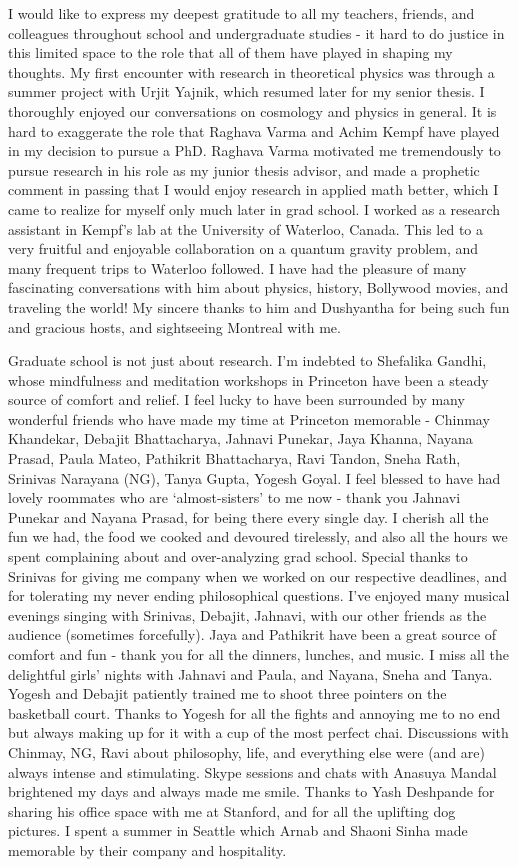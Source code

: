 I would like to express my deepest gratitude to all my teachers, friends, and colleagues throughout school and undergraduate studies - it hard to do justice in this limited space to the role that all of them have played in shaping my thoughts. My first encounter with research in theoretical physics was through a summer project with Urjit Yajnik, which resumed later for my senior thesis. I thoroughly enjoyed our conversations on cosmology and physics in general. It is hard to exaggerate the role that Raghava Varma and Achim Kempf have played in my decision to pursue a PhD. Raghava Varma motivated me tremendously to pursue research in his role as my junior thesis advisor, and made a prophetic comment in passing that I would enjoy research in applied math better, which I came to realize for myself only much later in grad school. I worked as a research assistant in Kempf's lab at the University of Waterloo, Canada. This led to a very fruitful and enjoyable collaboration on a quantum gravity problem, and many frequent trips to Waterloo followed. I have had the pleasure of many fascinating conversations with him about physics, history, Bollywood movies, and traveling the world! My sincere thanks to him and Dushyantha for being such fun and gracious hosts, and sightseeing Montreal with me.

Graduate school is not just about research. I'm indebted to Shefalika Gandhi, whose mindfulness and meditation workshops in Princeton have been a steady source of comfort and relief. I feel lucky to have been surrounded by many wonderful friends who have made my time at Princeton memorable - Chinmay Khandekar, Debajit Bhattacharya, Jahnavi Punekar, Jaya Khanna, Nayana Prasad, Paula Mateo, Pathikrit Bhattacharya, Ravi Tandon, Sneha Rath, Srinivas Narayana (NG), Tanya Gupta, Yogesh Goyal. I feel blessed to have had lovely roommates who are `almost-sisters’ to me now - thank you Jahnavi Punekar and Nayana Prasad, for being there every single day. I cherish all the fun we had, the food we cooked and devoured tirelessly, and also all the hours we spent complaining about and over-analyzing grad school. Special thanks to Srinivas for giving me company when we worked on our respective deadlines, and for tolerating my never ending philosophical questions. I've enjoyed many musical evenings singing with Srinivas, Debajit, Jahnavi, with our other friends as the audience (sometimes forcefully). Jaya and Pathikrit have been a great source of comfort and fun - thank you for all the dinners, lunches, and music. I miss all the delightful girls' nights with Jahnavi and Paula, and Nayana, Sneha and Tanya. Yogesh and Debajit patiently trained me to shoot three pointers on the basketball court. Thanks to Yogesh for all the fights and annoying me to no end but always making up for it with a cup of the most perfect chai. Discussions with Chinmay, NG, Ravi about philosophy, life, and everything else were (and are) always intense and stimulating. Skype sessions and chats with Anasuya Mandal brightened my days and always made me smile. Thanks to Yash Deshpande for sharing his office space with me at Stanford, and for all the uplifting dog pictures. I spent a summer in Seattle which Arnab and Shaoni Sinha made memorable by their company and hospitality. 

